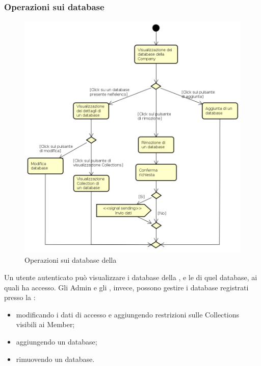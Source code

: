 \subsubsection{Operazioni sui database}
\begin{figure}[H]
\begin{center}
\includegraphics[height=12cm]{res/sections/backend/activities/gestioneDatabase.png}
\caption{Operazioni sui database della }
\end{center}
\end{figure}
Un utente autenticato può visualizzare i database della , e le  di quel database, ai quali ha accesso. Gli Admin e gli , invece, possono gestire i database registrati presso la :
\begin{itemize}
\item modificando i dati di accesso e aggiungendo restrizioni sulle Collections visibili ai Member;
\item aggiungendo un database;
\item rimuovendo un database.
\end{itemize} 
\newpage
